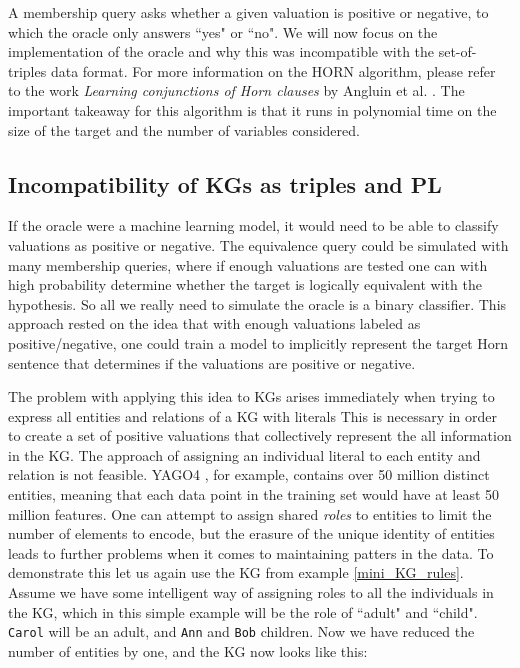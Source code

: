 A membership query asks whether a given valuation is positive or negative, to which the oracle only answers ``yes" or ``no". We will now focus on the implementation of the oracle and why this was incompatible with the set-of-triples data format. For more information on the HORN algorithm, please refer to the work \textit{Learning conjunctions of Horn clauses} by Angluin et al. \cite{DBLP:journals/ml/AngluinFP92}. The important takeaway for this algorithm is that it runs in polynomial time on the size of the target and the number of variables considered.


\subsection{Incompatibility of KGs as triples and PL}
If the oracle were a machine learning model, it would need to be able to classify valuations as positive or negative. The equivalence query could be simulated with many membership queries, where if enough valuations are tested one can with high probability determine whether the target is logically equivalent with the hypothesis. So all we really need to simulate the oracle is a binary classifier. This approach rested on the idea that with enough valuations labeled as positive/negative, one could train a model to implicitly represent the target Horn sentence that determines if the valuations are positive or negative. 

The problem with applying this idea to KGs arises immediately when trying to express all entities and relations of a KG with literals This is necessary in order to create a set of positive valuations that collectively represent the all information in the KG. The approach of assigning an individual literal to each entity and relation is not feasible. YAGO4 \cite{yago4}, for example, contains over 50 million distinct entities, meaning that each data point in the training set would have at least 50 million features. One can attempt to assign shared \textit{roles} to entities to limit the number of elements to encode, but the erasure of the unique identity of entities leads to further problems when it comes to maintaining patters in the data. To demonstrate this let us again use the KG from example \ref{mini_KG_rules}. Assume we have some intelligent way of assigning roles to all the individuals in the KG, which in this simple example will be the role of ``adult" and ``child". \texttt{Carol} will be an adult, and \texttt{Ann} and \texttt{Bob} children. Now we have reduced the number of entities by one, and the KG now looks like this:


